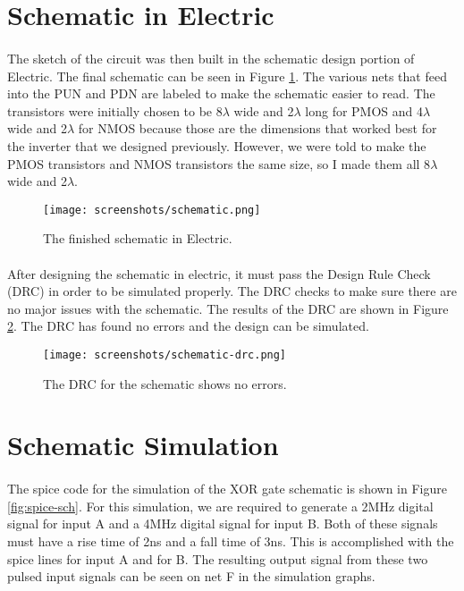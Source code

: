 \documentclass{article}
\begin{document}
\section{Schematic in Electric}

  \paragraph{}
  The sketch of the circuit was then built in the schematic design portion of Electric. The final schematic can be seen in Figure \ref{fig:schem}. The various nets that feed into the PUN and PDN are labeled to make the schematic easier to read. The transistors were initially chosen to be 8$\lambda$ wide and 2$\lambda$ long for PMOS and 4$\lambda$ wide and 2$\lambda$ for NMOS because those are the dimensions that worked best for the inverter that we designed previously. However, we were told to make the PMOS transistors and NMOS transistors the same size, so I made them all 8$\lambda$ wide and 2$\lambda$.

  \begin{figure}[H]
    \centering
    \texttt{[image: screenshots/schematic.png]}
    \caption{The finished schematic in Electric.}
    \label{fig:schem}
  \end{figure}

  \paragraph{}
  After designing the schematic in electric, it must pass the Design Rule Check (DRC) in order to be simulated properly. The DRC checks to make sure there are no major issues with the schematic. The results of the DRC are shown in Figure \ref{fig:sch-drc}. The DRC has found no errors and the design can be simulated.

  \begin{figure}[H]
    \centering
    \texttt{[image: screenshots/schematic-drc.png]}
    \caption{The DRC for the schematic shows no errors.}
    \label{fig:sch-drc}
  \end{figure}

\section{Schematic Simulation}
  \paragraph{}
  The spice code for the simulation of the XOR gate schematic is shown in Figure \ref{fig:spice-sch}. For this simulation, we are required to generate a 2MHz digital signal for input A and a 4MHz digital signal for input B. Both of these signals must have a rise time of 2ns and a fall time of 3ns. This is accomplished with the spice lines  for input A and  for B. The resulting output signal from these two pulsed input signals can be seen on net F in the simulation graphs.
\end{document}
